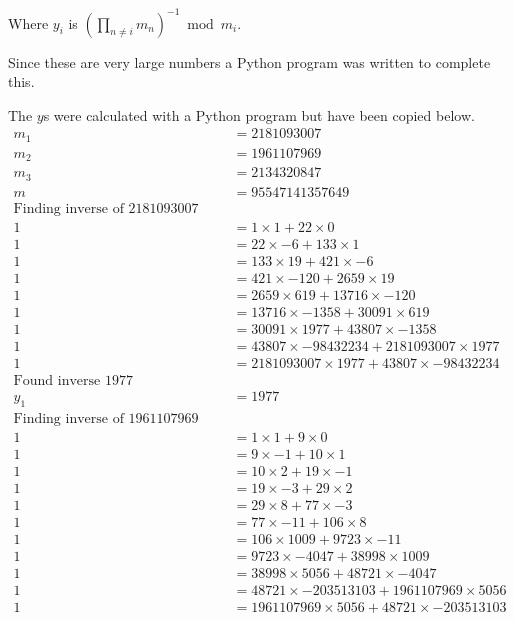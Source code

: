 \documentclass{article}
\begin{document}
Where $y_i$ is $(\prod_{n \neq i} m_n)^{-1} \bmod m_i$.

Since these are very large numbers a Python program was written to complete
this.


The $y$s were calculated with a Python program but have been copied below.
\begin{align*}
    m_1 &= 2181093007 \\
    m_2 &= 1961107969 \\
    m_3 &= 2134320847 \\
    m &= 95547141357649 \\
    \text{Finding inverse of 2181093007 mod 43807} \\
    1 &= 1 \times 1 + 22 \times 0 \\
    1 &= 22 \times -6 + 133 \times 1 \\
    1 &= 133 \times 19 + 421 \times -6 \\
    1 &= 421 \times -120 + 2659 \times 19 \\
    1 &= 2659 \times 619 + 13716 \times -120 \\
    1 &= 13716 \times -1358 + 30091 \times 619 \\
    1 &= 30091 \times 1977 + 43807 \times -1358 \\
    1 &= 43807 \times -98432234 + 2181093007 \times 1977 \\
    1 &= 2181093007 \times 1977 + 43807 \times -98432234 \\
    \text{Found inverse 1977} \\
    y_1 &= 1977 \\
    \text{Finding inverse of 1961107969 mod 48721} \\
    1 &= 1 \times 1 + 9 \times 0 \\
    1 &= 9 \times -1 + 10 \times 1 \\
    1 &= 10 \times 2 + 19 \times -1 \\
    1 &= 19 \times -3 + 29 \times 2 \\
    1 &= 29 \times 8 + 77 \times -3 \\
    1 &= 77 \times -11 + 106 \times 8 \\
    1 &= 106 \times 1009 + 9723 \times -11 \\
    1 &= 9723 \times -4047 + 38998 \times 1009 \\
    1 &= 38998 \times 5056 + 48721 \times -4047 \\
    1 &= 48721 \times -203513103 + 1961107969 \times 5056 \\
    1 &= 1961107969 \times 5056 + 48721 \times -203513103 \\

\end{align*}
\end{document}

